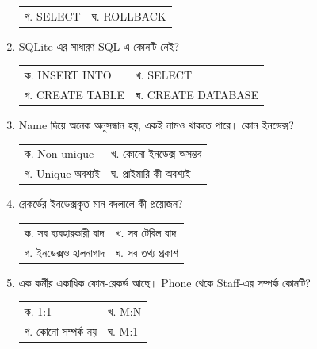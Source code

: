 \begin{multicols}{2}
\begin{enumerate}[resume]
\begin{minipage}[t]{\linewidth}
\begin{tabularx}{\linewidth}{@{}X X@{}}
গ. SELECT & ঘ. ROLLBACK \\
\end{tabularx}
\end{minipage}
\vspace{1pt}
\item \begin{minipage}[t]{\linewidth}
SQLite-এর সাধারণ SQL-এ কোনটি নেই?
\par
\begin{tabularx}{\linewidth}{@{}X X@{}}
ক. INSERT INTO & খ. SELECT \\
গ. CREATE TABLE & ঘ. CREATE DATABASE \\
\end{tabularx}
\end{minipage}
\vspace{1pt}
\item \begin{minipage}[t]{\linewidth}
Name দিয়ে অনেক অনুসন্ধান হয়, একই নামও থাকতে পারে। কোন ইনডেক্স?
\par
\begin{tabularx}{\linewidth}{@{}X X@{}}
ক. Non-unique & খ. কোনো ইনডেক্স অসম্ভব \\
গ. Unique অবশ্যই & ঘ. প্রাইমারি কী অবশ্যই \\
\end{tabularx}
\end{minipage}
\vspace{1pt}
\item \begin{minipage}[t]{\linewidth}
রেকর্ডের ইনডেক্সকৃত মান বদলালে কী প্রয়োজন?
\par
\begin{tabularx}{\linewidth}{@{}X X@{}}
ক. সব ব্যবহারকারী বাদ & খ. সব টেবিল বাদ \\
গ. ইনডেক্সও হালনাগাদ & ঘ. সব তথ্য প্রকাশ \\
\end{tabularx}
\end{minipage}
\vspace{1pt}
\item \begin{minipage}[t]{\linewidth}
এক কর্মীর একাধিক ফোন-রেকর্ড আছে। Phone থেকে Staff-এর সম্পর্ক কোনটি?
\par
\begin{tabularx}{\linewidth}{@{}X X@{}}
ক. 1:1 & খ. M:N \\
গ. কোনো সম্পর্ক নয় & ঘ. M:1 \\
\end{tabularx}
\end{minipage}

\end{enumerate}
\end{multicols}
